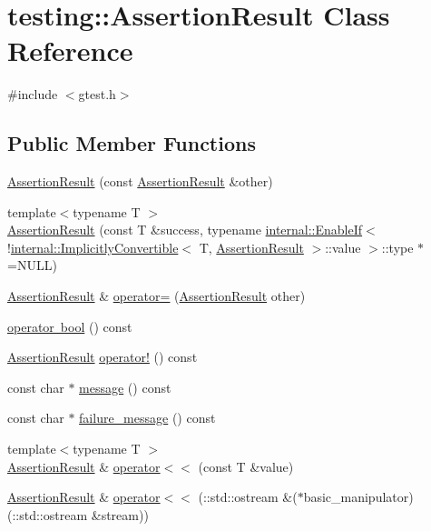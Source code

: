 \hypertarget{classtesting_1_1_assertion_result}{}\section{testing\+::Assertion\+Result Class Reference}
\label{classtesting_1_1_assertion_result}


{\ttfamily \#include $<$gtest.\+h$>$}

\subsection*{Public Member Functions}
\begin{DoxyCompactItemize}
\item 
\mbox{\hyperlink{classtesting_1_1_assertion_result_a27788116f03f90aec4daf592fd809ead}{Assertion\+Result}} (const \mbox{\hyperlink{classtesting_1_1_assertion_result}{Assertion\+Result}} \&other)
\item 
{\footnotesize template$<$typename T $>$ }\\\mbox{\hyperlink{classtesting_1_1_assertion_result_a9b8d1d6d0a979d0769ed4ff97d06c4e3}{Assertion\+Result}} (const T \&success, typename \mbox{\hyperlink{structtesting_1_1internal_1_1_enable_if}{internal\+::\+Enable\+If}}$<$ !\mbox{\hyperlink{classtesting_1_1internal_1_1_implicitly_convertible}{internal\+::\+Implicitly\+Convertible}}$<$ T, \mbox{\hyperlink{classtesting_1_1_assertion_result}{Assertion\+Result}} $>$\+::value $>$\+::type $\ast$=N\+U\+LL)
\item 
\mbox{\hyperlink{classtesting_1_1_assertion_result}{Assertion\+Result}} \& \mbox{\hyperlink{classtesting_1_1_assertion_result_aad9274c7b69eda67eb9306963a790839}{operator=}} (\mbox{\hyperlink{classtesting_1_1_assertion_result}{Assertion\+Result}} other)
\item 
\mbox{\hyperlink{classtesting_1_1_assertion_result_ab3f34b1623c82762ef4a8f52b535159c}{operator bool}} () const
\item 
\mbox{\hyperlink{classtesting_1_1_assertion_result}{Assertion\+Result}} \mbox{\hyperlink{classtesting_1_1_assertion_result_a5b0784686a756660ac8dfe528d89386b}{operator!}} () const
\item 
const char $\ast$ \mbox{\hyperlink{classtesting_1_1_assertion_result_a33c14dafd28e3393c841e03f4b70a017}{message}} () const
\item 
const char $\ast$ \mbox{\hyperlink{classtesting_1_1_assertion_result_aa38908d5a48c912434a80c8725f52583}{failure\+\_\+message}} () const
\item 
{\footnotesize template$<$typename T $>$ }\\\mbox{\hyperlink{classtesting_1_1_assertion_result}{Assertion\+Result}} \& \mbox{\hyperlink{classtesting_1_1_assertion_result_a3230efa81aafe7c61f5fb878cfa39e91}{operator$<$$<$}} (const T \&value)
\item 
\mbox{\hyperlink{classtesting_1_1_assertion_result}{Assertion\+Result}} \& \mbox{\hyperlink{classtesting_1_1_assertion_result_a43ae8a260843ce2ff3dc9af262672b8b}{operator$<$$<$}} (\+::std\+::ostream \&($\ast$basic\+\_\+manipulator)(\+::std\+::ostream \&stream))
\end{DoxyCompactItemize}


